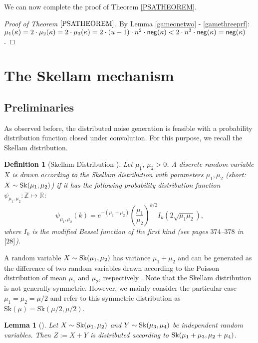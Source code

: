 \documentclass[10pt]{extarticle}
\newtheorem{Lem}[Thm]{Lemma}
\newtheorem{Def}{Definition}
\begin{document}
\noindent We can now complete the proof of Theorem \ref{PSATHEOREM}.

\begin{proof}[Proof of Theorem $\ref{PSATHEOREM}$]  By Lemma \ref{gameonetwo} - \ref{gamethreeprf}:\\
$\mu_1(\kappa)=2\cdot\mu_2(\kappa)=2\cdot\mu_3(\kappa)=2\cdot(u-1)\cdot n^2\cdot\text{\upshape\sffamily neg}(\kappa)<2\cdot n^3\cdot\text{\upshape\sffamily neg}(\kappa)=\text{\upshape\sffamily neg}(\kappa)$.
\end{proof}






\section{The Skellam mechanism}\label{skellamsec}

\subsection{Preliminaries}

As observed before, the distributed noise generation is feasible with a probability distribution function closed under convolution. For this purpose, we recall the Skellam distribution.


\begin{Def}[Skellam Distribution \cite{29}]\label{skellam} Let $\mu_1$, $\mu_2> 0$. A discrete random variable $X$ is drawn according to the Skellam distribution with parameters $\mu_1,\mu_2$ (short: $X\sim \text{\upshape Sk}(\mu_1,\mu_2)$) if it has the following probability distribution function $\psi_{\mu_1,\mu_2}\colon\mathbb{Z}\mapsto\mathbb{R}$:
\[\psi_{\mu_1,\mu_2}(k)=e^{-(\mu_1+\mu_2)}\left(\frac{\mu_1}{\mu_2}\right)^{k/2}I_k(2\sqrt{\mu_1\mu_2}),\]
where $I_k$ is the modified Bessel function of the first kind (see pages $374$--$378$ in $\cite{28}$).
\end{Def}

A random variable $X\sim \text{\upshape Sk}(\mu_1,\mu_2)$ has variance $\mu_1+\mu_2$ and can be generated as the difference of two random variables drawn according to the Poisson distribution of mean $\mu_1$ and $\mu_2$, respectively \cite{29}. Note that the Skellam distribution is not generally symmetric. However, we mainly consider the particular case $\mu_1=\mu_2=\mu/2$ and refer to this symmetric distribution as $\text{Sk}(\mu) = \text{Sk}(\mu/2,\mu/2)$.


\begin{Lem}[\cite{29}]\label{sksum} Let $X\sim \text{\upshape Sk}(\mu_1,\mu_2)$ and $Y\sim \text{\upshape Sk}(\mu_3,\mu_4)$ be independent random variables. Then $Z:=X+Y$ is distributed according to $\text{\upshape Sk}(\mu_1+\mu_3,\mu_2+\mu_4)$.
\end{Lem}
\end{document}
